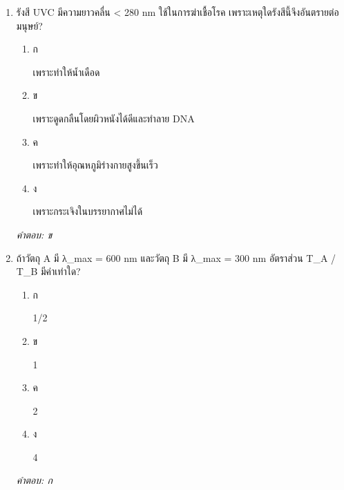 \documentclass[12pt]{article}
\begin{document}
\begin{enumerate}[label=\arabic*., itemsep=0.5\baselineskip, topsep=0.5\baselineskip, leftmargin=*]
\item รังสี UVC มีความยาวคลื่น < 280 nm ใช้ในการฆ่าเชื้อโรค เพราะเหตุใดรังสีนี้จึงอันตรายต่อมนุษย์?
\begin{enumerate}[label=\alph*)., itemsep=0.3\baselineskip, topsep=0.3\baselineskip]
\item ก\ 
\begin{minipage}[t]{0.9\linewidth}
\raggedright เพราะทำให้น้ำเดือด
\end{minipage}
\item ข\ 
\begin{minipage}[t]{0.9\linewidth}
\raggedright เพราะดูดกลืนโดยผิวหนังได้ดีและทำลาย DNA
\end{minipage}
\item ค\ 
\begin{minipage}[t]{0.9\linewidth}
\raggedright เพราะทำให้อุณหภูมิร่างกายสูงขึ้นเร็ว
\end{minipage}
\item ง\ 
\begin{minipage}[t]{0.9\linewidth}
\raggedright เพราะกระเจิงในบรรยากาศไม่ได้
\end{minipage}
\end{enumerate}
\vspace{-0.3\baselineskip}
\begin{small}
\textit{คำตอบ: ข}
\end{small}

\item ถ้าวัตถุ A มี λ\_max = 600 nm และวัตถุ B มี λ\_max = 300 nm อัตราส่วน T\_A / T\_B มีค่าเท่าใด?
\begin{enumerate}[label=\alph*)., itemsep=0.3\baselineskip, topsep=0.3\baselineskip]
\item ก\ 
\begin{minipage}[t]{0.9\linewidth}
\raggedright 1/2
\end{minipage}
\item ข\ 
\begin{minipage}[t]{0.9\linewidth}
\raggedright 1
\end{minipage}
\item ค\ 
\begin{minipage}[t]{0.9\linewidth}
\raggedright 2
\end{minipage}
\item ง\ 
\begin{minipage}[t]{0.9\linewidth}
\raggedright 4
\end{minipage}
\end{enumerate}
\vspace{-0.3\baselineskip}
\begin{small}
\textit{คำตอบ: ก}
\end{small}


\end{enumerate}
\end{document}
